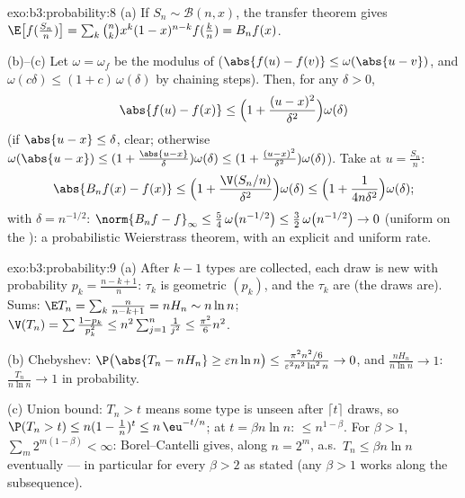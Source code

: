 \begin{solution}{exo:b3:probability:8}
(a) If $S_n \sim \mathcal B(n, x)$, the transfer theorem
gives $\E\bigl[f(\frac{S_n}n)\bigr] =
\sum_k\binom nkx^k(1-x)^{n-k}f(\frac kn) = B_nf(x)$.

(b)--(c) Let $\omega = \omega_f$ be the modulus of 
($\abs{f(u) - f(v)} \leq \omega(\abs{u - v})$, and $\omega(c
\delta) \leq (1 + c)\,\omega(\delta)$ by chaining steps).
Then, for any $\delta > 0$,
\[
\abs{f(u) - f(x)} \leq \Bigl(1 + \frac{(u -
x)^2}{\delta^2}\Bigr)\omega(\delta)
\]
(if $\abs{u - x} \leq \delta$, clear; otherwise
$\omega(\abs{u-x}) \leq (1 + \frac{\abs{u-x}}\delta)
\omega(\delta) \leq (1 + \frac{(u-x)^2}{\delta^2})
\omega(\delta)$). Take  at $u = \frac{S_n}n$:
\[
\abs{B_nf(x) - f(x)} \leq
\Bigl(1 + \frac{\V(S_n/n)}{\delta^2}\Bigr)\omega(\delta)
\leq \Bigl(1 + \frac{1}{4n\delta^2}\Bigr)\omega(\delta) ;
\]
with $\delta = n^{-1/2}$: $\norm{B_nf - f}_\infty \leq
\frac54\,\omega\bigl(n^{-1/2}\bigr) \leq
\frac32\,\omega\bigl(n^{-1/2}\bigr) \to 0$ (uniform
 on the ): a probabilistic Weierstrass
theorem, with an explicit and uniform rate.
\end{solution}

\begin{solution}{exo:b3:probability:9}
(a) After $k - 1$ types are collected, each draw is new with
probability $p_k = \frac{n-k+1}n$: $\tau_k$ is geometric
$(p_k)$, and the $\tau_k$ are  (the draws are).
Sums: $\E T_n = \sum_k\frac n{n-k+1} = nH_n \sim n\ln n$;
$\V(T_n) = \sum\frac{1 - p_k}{p_k^2} \leq
n^2\sum_{j=1}^n\frac1{j^2} \leq \frac{\pi^2}6n^2$.

(b) Chebyshev: $\P\bigl(\abs{T_n - nH_n} \geq \varepsilon
n\ln n\bigr) \leq \frac{\pi^2n^2/6}{\varepsilon^2n^2\ln^2n}
\to 0$, and $\frac{nH_n}{n\ln n} \to 1$: $\frac{T_n}{n\ln n}
\to 1$ in probability.

(c) Union bound: $T_n > t$ means some type is unseen after
$\lceil t\rceil$ draws, so $\P(T_n > t) \leq n(1 -
\frac1n)^{t} \leq n\,\eu^{-t/n}$; at $t = \beta n\ln n$:
$\leq n^{1 - \beta}$. For $\beta > 1$, $\sum_m
2^{m(1-\beta)} < \infty$: Borel--Cantelli gives, along $n =
2^m$, a.s.\ $T_n \leq \beta n\ln n$ eventually --- in
particular for every $\beta > 2$ as stated (any $\beta > 1$
works along the subsequence).
\end{solution}

